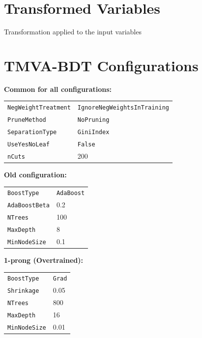 \clearpage
\section{Transformed Variables}
\label{app:variable_transforms}

\begin{table}[htb]
  \centering
  
  \caption{Transformation applied to the input variables}
\end{table}

\clearpage
\section{TMVA-BDT Configurations}
\label{app:tmva_config}

\noindent\textbf{Common for all configurations:}\\[0.3em]
\begin{tabular}{ll}
  \texttt{NegWeightTreatment} & \texttt{IgnoreNegWeightsInTraining} \\
  \texttt{PruneMethod} & \texttt{NoPruning} \\
  \texttt{SeparationType} & \texttt{GiniIndex} \\
  \texttt{UseYesNoLeaf} & \texttt{False} \\
  \texttt{nCuts} & 200
\end{tabular}

\vfill

\noindent\textbf{Old configuration:}\\[0.3em]
\begin{tabular}{ll}
  \texttt{BoostType} & \texttt{AdaBoost} \\
  \texttt{AdaBoostBeta} & 0.2 \\
  \texttt{NTrees} & 100 \\
  \texttt{MaxDepth} & 8 \\
  \texttt{MinNodeSize} & 0.1 \\
\end{tabular}

\vfill

\noindent\textbf{1-prong (Overtrained):}\\[0.3em]
\begin{tabular}{ll}
  \texttt{BoostType} & \texttt{Grad} \\
  \texttt{Shrinkage} & 0.05 \\
  \texttt{NTrees} & 800 \\
  \texttt{MaxDepth} & 16 \\
  \texttt{MinNodeSize} & 0.01 \\
\end{tabular}

